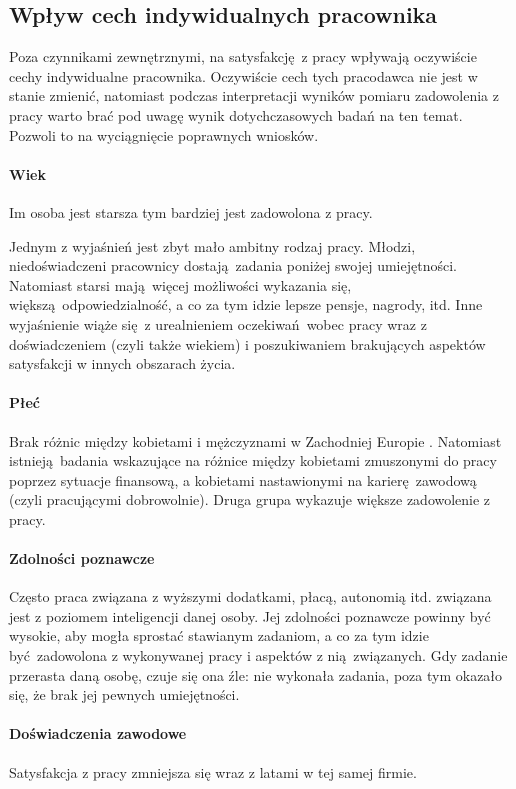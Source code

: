 \subsection{Wpływ cech indywidualnych pracownika}
\label{sec:theory-sat-age}
Poza czynnikami zewnętrznymi, na satysfakcję z pracy wpływają oczywiście cechy indywidualne pracownika. Oczywiście cech tych pracodawca nie jest w stanie zmienić, natomiast podczas interpretacji wyników pomiaru zadowolenia z pracy warto brać pod uwagę wynik dotychczasowych badań na ten temat. Pozwoli to na wyciągnięcie poprawnych wniosków.

\paragraph{Wiek} Im osoba jest starsza tym bardziej jest zadowolona z pracy. 

Jednym z wyjaśnień jest zbyt mało ambitny rodzaj pracy. Młodzi, niedoświadczeni pracownicy dostają zadania poniżej swojej umiejętności. Natomiast starsi mają więcej możliwości wykazania się, większą odpowiedzialność, a co za tym idzie lepsze pensje, nagrody, itd. Inne wyjaśnienie wiąże się z urealnieniem oczekiwań wobec pracy wraz z doświadczeniem (czyli
także wiekiem) i poszukiwaniem brakujących aspektów satysfakcji w innych obszarach życia.
\paragraph{Płeć} Brak różnic między kobietami i mężczyznami w Zachodniej Europie \citep{de1991gender}. Natomiast istnieją badania wskazujące na różnice między kobietami zmuszonymi do pracy poprzez sytuacje finansową, a kobietami nastawionymi na karierę zawodową (czyli pracującymi dobrowolnie). Druga grupa wykazuje większe zadowolenie z pracy.
\paragraph{Zdolności poznawcze} Często praca związana z wyższymi dodatkami, płacą, autonomią itd. związana jest z poziomem inteligencji danej osoby. Jej zdolności poznawcze powinny być wysokie, aby mogła sprostać stawianym zadaniom, a co za tym idzie być zadowolona z wykonywanej pracy i aspektów z nią związanych. Gdy zadanie przerasta daną osobę, czuje się ona źle: nie wykonała zadania, poza tym okazało się, że brak jej pewnych umiejętności.
\paragraph{Doświadczenia zawodowe} Satysfakcja z pracy zmniejsza się wraz z latami w tej samej firmie. 

